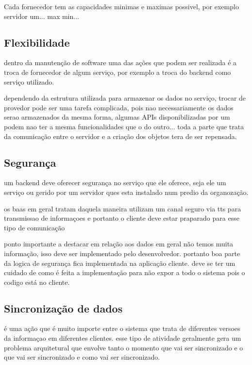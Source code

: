 	Cada fornecedor tem as capacidades minimas e maximas possivel, por exemplo 	
	servidor um... max min...

	\subsection{Flexibilidade}%

	dentro da manutenção de software uma das ações que podem ser realizada é a troca de fornecedor de algum serviço, por exemplo a troca do backend como serviço utilizado.

	dependendo da estrutura utilizada para armazenar os dados no serviço, trocar de provedor pode ser uma tarefa complicada, pois nao necessariamente os dados serao armazenados da mesma forma, algumas APIs disponibilizadas por um podem nao ter a mesma funcionalidades que o do outro... toda a parte que trata da comunicação entre o servidor e a criação dos objetos tera de ser repensada.


	\subsection{Segurança}%
	um backend deve oferecer segurança no serviço que ele oferece, seja ele um serviço ou gerido por um servidor ques esta instalado num predio da organozação.

	os baas em geral tratam daquela maneira
		utilizam um canal seguro via tts para transmissao de informaçoes
		e portanto o cliente deve estar praparado para esse tipo de comunicação

	ponto importante a destacar
	em relação aos dados em geral não temos muita informação, isso deve ser implementado pelo desenvolvedor. portanto boa parte da logica de segurança fica implementada na aplicação cliente. deve se ter um cuidado de como é feita a implementação para não expor a todo o sistema pois o codigo está no cliente.



	\subsection{Sincronização de dados}%
	é uma ação que é muito importe entre o sistema que trata de diferentes versoes da informaçao em diferentes clientes. esse tipo de atividade geralmente gera um problema arquitetural que envolve tanto o momento que vai ser sincronizado e o que vai ser sincronizado e como vai ser sincronizado.

